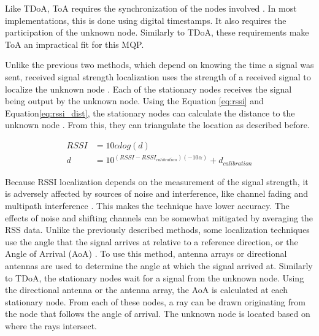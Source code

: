 Like TDoA, ToA requires the synchronization of the nodes involved \cite{local_conf}. In most implementations, this is done using digital timestamps. It also requires the participation of the unknown node. Similarly to TDoA, these requirements make ToA an impractical fit for this MQP. \par

Unlike the previous two methods, which depend on knowing the time a signal was sent, received signal strength localization uses the strength of a received signal to localize the unknown node \cite{local_conf}. Each of the stationary nodes receives the signal being output by the unknown node. Using the Equation \ref{eq:rssi} and Equation\ref{eq:rssi_dist}, the stationary nodes can calculate the distance to the unknown node \cite{rss_calc}. From this, they can triangulate the location as described before.\par
\begin{align}
\label{eq:rssi} RSSI &= 10\alpha log(d) \\ 
\label{eq:rssi_dist} d &= 10^{(RSSI-RSSI_{calibration})(-10\alpha)} + d_{calibration}
\end{align}
\par
Because RSSI localization depends on the measurement of the signal strength, it is adversely affected by sources of noise and interference, like channel fading and multipath interference \cite{local_conf}. This makes the technique have lower accuracy. The effects of noise and shifting channels can be somewhat mitigated by averaging the RSS data.
Unlike the previously described methods, some localization techniques use the angle that the signal arrives at relative to a reference direction, or the Angle of Arrival (AoA) \cite{local_aoa}. To use this method, antenna arrays or directional antennas are used to determine the angle at which the signal arrived at. Similarly to TDoA, the stationary nodes wait for a signal from the unknown node. Using the directional antenna or the antenna array, the AoA is calculated at each stationary node. From each of these nodes, a ray can be drawn originating from the node that follows the angle of arrival. The unknown node is located based on where the rays intersect.

